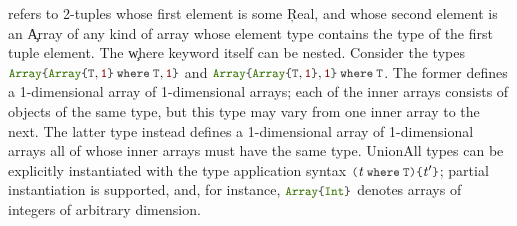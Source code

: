 %
refers to 2-tuples whose first element is some \c{Real}, and whose second
element is an \c{Array} of any kind of array whose element type contains
the type of the first tuple element.  The \c{where} keyword itself can be
nested. Consider the types
\(  \texttt{\small\color{jlbuiltin} Array}   \texttt{\small\color{jlkeyword} \{}   \texttt{\small\color{jlbuiltin} Array}   \texttt{\small\color{jlkeyword} \{}  \texttt{\small\color{jlbase}T}  \ottsym{,}   \texttt{\small\color{jlstring} 1}   \texttt{\small\color{jlkeyword} \}\kern0pt}  \:  \texttt{\small\color{jlbase}\textbf{where}\kern0pt} \:  \texttt{\small\color{jlbase}T}   \ottsym{,}   \texttt{\small\color{jlstring} 1}   \texttt{\small\color{jlkeyword} \}\kern0pt} \) and
\(  \texttt{\small\color{jlbuiltin} Array}   \texttt{\small\color{jlkeyword} \{}   \texttt{\small\color{jlbuiltin} Array}   \texttt{\small\color{jlkeyword} \{}  \texttt{\small\color{jlbase}T}  \ottsym{,}   \texttt{\small\color{jlstring} 1}   \texttt{\small\color{jlkeyword} \}\kern0pt}  \ottsym{,}   \texttt{\small\color{jlstring} 1}   \texttt{\small\color{jlkeyword} \}\kern0pt} \:  \texttt{\small\color{jlbase}\textbf{where}\kern0pt} \:  \texttt{\small\color{jlbase}T} \).
The former defines a 1-dimensional array of 1-dimensional arrays; each of
the inner arrays consists of objects of the same type, but this type may
vary from one inner array to the next. The latter type instead defines
a 1-dimensional array of 1-dimensional arrays all of whose inner arrays must
have the same type.  UnionAll types can be explicitly instantiated
with the type application syntax \(\texttt{\small\color{jlkeyword} (}   \ottnt{t} \:  \texttt{\small\color{jlbase}\textbf{where}\kern0pt} \:  \texttt{\small\color{jlbase}T}   \texttt{\small\color{jlkeyword} )}  \texttt{\small\color{jlkeyword} \{}  \ottnt{t'}  \texttt{\small\color{jlkeyword} \}\kern0pt}\); partial
instantiation is supported, and, for instance, \( \texttt{\small\color{jlbuiltin} Array}   \texttt{\small\color{jlkeyword} \{}   \texttt{\small\color{jlbuiltin}\color{jlbuiltin} Int}   \texttt{\small\color{jlkeyword} \}\kern0pt}\) denotes
arrays of
integers of arbitrary dimension.


